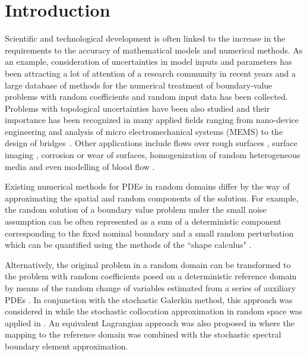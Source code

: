 
\section{Introduction}
\label{intro}

Scientific and technological development is often linked to the increase in the requirements to the accuracy of mathematical models and numerical methods.
As an example, consideration of uncertainties in model inputs and parameters has been attracting a lot of attention of a research community in recent years and a large database of methods for the numerical treatment of boundary-value problems with random coefficients and random input data has been collected.
Problems with topological uncertainties have been also studied and their importance has been recognized in many applied fields ranging from nano-device engineering and analysis of micro electromechanical systems (MEMS) \cite{Agarwal2007,Zhu2004} to the design of bridges~\cite{Canuto2009}.
Other applications include flows over rough surfaces \cite{Tartakovsky2006a,Zayernouri2013}, surface imaging \cite{Tsong2005}, corrosion or wear of surfaces, homogenization of random heterogeneous media \cite{Savvas2014} and even modelling of blood flow \cite{Park2012}. 


Existing numerical methods for PDEs in random domains differ by the way of approximating the spatial and random components of the solution.
For example, the random solution of a boundary value problem under the small noise assumption can be often represented as a sum of a deterministic component corresponding to the fixed nominal boundary and a small random perturbation which can be quantified using the methods of the ``shape calculus" \cite{Honda2005,Harbrecht2008}.

Alternatively, the original problem in a random domain can be transformed to the problem with random coefficients posed on a deterministic reference domain by means of the random change of variables estimated from a series of auxiliary PDEs \cite{Tartakovsky2006b}.
In conjunction with the stochastic Galerkin method, this approach was considered in \cite{Tartakovsky2006a,Kundu2014,Harbrecht2014} %
while the stochastic collocation approximation in random space was applied in \cite{Castrillon2014,Castrillon2015}. %
An equivalent Lagrangian approach was also proposed in \cite{Agarwal2007} where the mapping to the reference domain was combined with the stochastic spectral boundary element approximation. %

